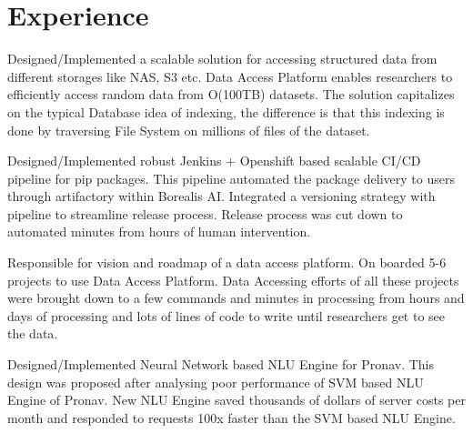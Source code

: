 \documentclass[]{deedy-resume-openfont}
\begin{document}
\begin{minipage}[t]{0.63\textwidth} 


\section{Experience}

\vspace{\topsep} %
\begin{tightemize}

\item Designed/Implemented a scalable solution for accessing structured data from different storages like NAS, S3 etc. Data Access Platform enables researchers to efficiently access random data from O(100TB) datasets. The solution capitalizes on the typical Database idea of indexing, the difference is that this indexing is done by traversing File System on millions of files of the dataset.

\item Designed/Implemented robust Jenkins + Openshift based scalable CI/CD pipeline for pip packages. This pipeline automated the package delivery to users through artifactory within Borealis AI. Integrated a versioning strategy with pipeline to streamline release process. Release process was cut down to automated minutes from hours of human intervention.

\item Responsible for vision and roadmap of a data access platform. On boarded 5-6 projects to use Data Access Platform. Data Accessing efforts of all these projects were brought down to a few commands and minutes in processing from hours and days of processing and lots of lines of code to write until researchers get to see the data.

\end{tightemize}
\sectionsep

\vspace{\topsep} %
\begin{tightemize}

\item Designed/Implemented Neural Network based NLU Engine for Pronav. This design was proposed after analysing poor performance of SVM based NLU Engine of Pronav. New NLU Engine saved thousands of dollars of server costs per month and responded to requests 100x faster than the SVM based NLU Engine. 


\end{tightemize}
\end{minipage}
\end{document}
